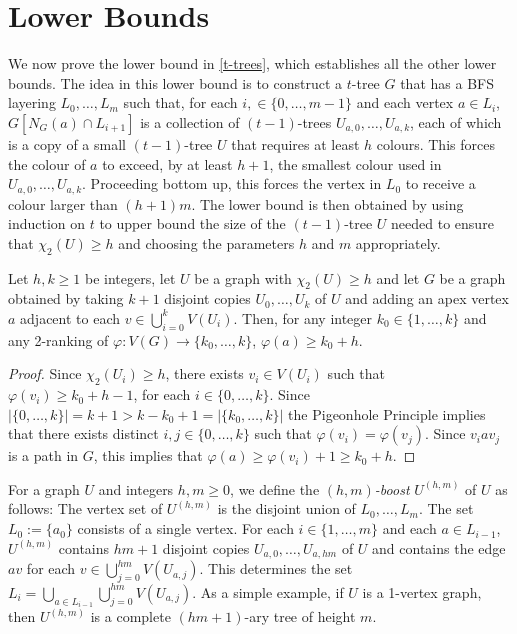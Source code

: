 \documentclass[kpfonts]{patmorin}
\newcommand{\trn}{\chi_2}
\theoremstyle{named}
\begin{document}
\section{Lower Bounds}
\label{lower-bounds}

We now prove the lower bound in \cref{t-trees}, which establishes all the other lower bounds. The idea in this lower bound is to construct a $t$-tree $G$ that has a BFS layering $L_0,\ldots,L_m$ such that, for each $i,\in\{0,\ldots,m-1\}$ and each vertex $a\in L_i$, $G[N_G(a)\cap L_{i+1}]$ is a collection of $(t-1)$-trees $U_{a,0},\ldots,U_{a,k}$, each of which is a copy of a small $(t-1)$-tree $U$ that requires at least $h$ colours.  This forces the colour of $a$ to exceed, by at least $h+1$, the smallest colour used in $U_{a,0},\ldots,U_{a,k}$.  Proceeding bottom up, this forces the vertex in $L_0$ to receive a colour larger than $(h+1)m$.  The lower bound is then obtained by using induction on $t$ to upper bound the size of the $(t-1)$-tree $U$ needed to ensure that $\trn(U)\ge h$ and choosing the parameters $h$ and $m$ appropriately.

\begin{lem}\label{apex-graph}
    Let $h,k\ge 1$ be integers, let $U$ be a graph with $\trn(U)\ge h$ and let $G$ be a graph obtained by taking $k+1$ disjoint copies $U_0,\ldots,U_k$ of $U$ and adding an apex vertex $a$ adjacent to each $v\in\bigcup_{i=0}^k V(U_i)$.  Then, for any integer $k_0\in \{1,\ldots,k\}$ and any 2-ranking of $\varphi:V(G)\to\{k_0,\ldots,k\}$, $\varphi(a) \ge k_0+h$.
\end{lem}

\begin{proof}
    Since $\trn(U_i)\ge h$, there exists $v_i\in V(U_i)$ such that $\varphi(v_i)\ge k_0+h-1$, for each $i\in\{0,\ldots,k\}$.  Since $|\{0,\ldots,k\}|=k+1>k-k_0+1=|\{k_0,\ldots,k\}|$ the Pigeonhole Principle implies that there exists distinct $i,j\in\{0,\ldots,k\}$ such that $\varphi(v_i)=\varphi(v_j)$.  Since $v_i a v_j$ is a path in $G$, this implies that $\varphi(a)\ge \varphi(v_i)+1\ge k_0+h$.
\end{proof}

For a graph $U$ and integers $h,m\ge 0$, we define the \emph{$(h,m)$-boost} $U^{(h,m)}$ of $U$ as follows: The vertex set of $U^{(h,m)}$ is the disjoint union of $L_0,\ldots,L_m$.  The set $L_0:=\{a_0\}$ consists of a single vertex. For each $i\in\{1,\ldots,m\}$ and each $a\in L_{i-1}$, $U^{(h,m)}$ contains $hm+1$ disjoint copies $U_{a,0},\ldots,U_{a,hm}$ of $U$ and contains the edge $av$ for each $v\in\bigcup_{j=0}^{hm} V(U_{a,j})$.  This determines the set $L_i=\bigcup_{a\in L_{i-1}}\bigcup_{j=0}^{hm} V(U_{a,j})$.  As a simple example, if $U$ is a 1-vertex graph, then $U^{(h,m)}$ is a complete $(hm+1)$-ary tree of height $m$.
\end{document}
